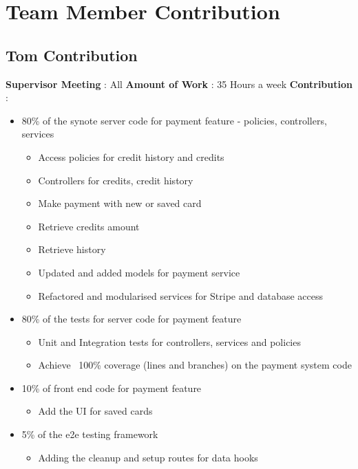 \chapter{Team Member Contribution}
\label{appendix:team-member-contribution}

\section{Tom Contribution}
\textbf{Supervisor Meeting} : All
\newline
\textbf{Amount of Work} : 35 Hours a week
\newline
\textbf{Contribution} :
\begin{itemize}
	\item 80\% of the synote server code for payment feature - policies, controllers, services
		\begin{itemize}
			\item Access policies for credit history and credits
			\item Controllers for credits, credit history
			\item Make payment with new or saved card
			\item Retrieve credits amount
			\item Retrieve history
			\item Updated and added models for payment service
			\item Refactored and modularised services for Stripe and database access
		\end{itemize}
	\item 80\% of the tests for server code for payment feature
		\begin{itemize}
			\item Unit and Integration tests for controllers, services and policies
			\item Achieve ~100\% coverage (lines and branches) on the payment system code
		\end{itemize}
	\item 10\% of front end code for payment feature
		\begin{itemize}
			\item Add the UI for saved cards
		\end{itemize}
	\item 5\% of the e2e testing framework
		\begin{itemize}
			\item Adding the cleanup and setup routes for data hooks
		\end{itemize}

\end{itemize}
